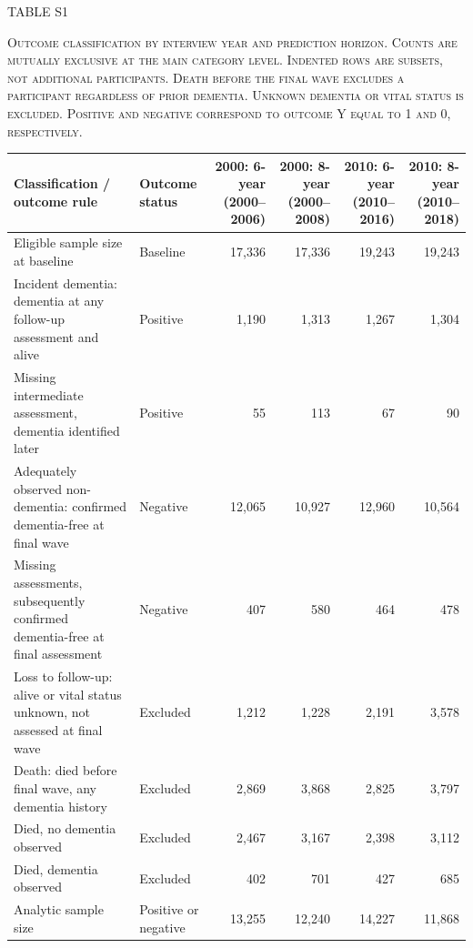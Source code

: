 \documentclass[10pt]{article}
\begin{document}
\begin{center}
{\normalsize TABLE S1\par}
\vspace{2pt}
{\small\scshape Outcome classification by interview year and prediction horizon. Counts are mutually exclusive at the main category level. Indented rows are subsets, not additional participants. Death before the final wave excludes a participant regardless of prior dementia. Unknown dementia or vital status is excluded. Positive and negative correspond to outcome Y equal to 1 and 0, respectively.\par}
\end{center}
\vspace{6pt}
\footnotesize
\renewcommand{\arraystretch}{1.25}
\setlength{\tabcolsep}{5pt}
\noindent\begin{tabularx}{\textwidth}{@{}L >{\raggedright\arraybackslash}p{30mm} R R R R@{}}
\toprule
\textbf{Classification / outcome rule} & \textbf{Outcome status} & \textbf{2000: 6-year} \newline \textbf{(2000--2006)} & \textbf{2000: 8-year} \newline \textbf{(2000--2008)} & \textbf{2010: 6-year} \newline \textbf{(2010--2016)} & \textbf{2010: 8-year} \newline \textbf{(2010--2018)} \\
\midrule
Eligible sample size at baseline & Baseline & 17,336 & 17,336 & 19,243 & 19,243 \\
Incident dementia: dementia at any follow-up assessment and alive & Positive & 1,190 & 1,313 & 1,267 & 1,304 \\
\hspace*{1em}Missing intermediate assessment, dementia identified later & Positive & 55 & 113 & 67 & 90 \\
Adequately observed non-dementia: confirmed dementia-free at final wave & Negative & 12,065 & 10,927 & 12,960 & 10,564 \\
\hspace*{1em}Missing assessments, subsequently confirmed dementia-free at final assessment & Negative & 407 & 580 & 464 & 478 \\
Loss to follow-up: alive or vital status unknown, not assessed at final wave & Excluded & 1,212 & 1,228 & 2,191 & 3,578 \\
Death: died before final wave, any dementia history & Excluded & 2,869 & 3,868 & 2,825 & 3,797 \\
\hspace*{1em}Died, no dementia observed & Excluded & 2,467 & 3,167 & 2,398 & 3,112 \\
\hspace*{1em}Died, dementia observed & Excluded & 402 & 701 & 427 & 685 \\
Analytic sample size & Positive or negative & 13,255 & 12,240 & 14,227 & 11,868 \\
\bottomrule
\end{tabularx}
\end{document}
